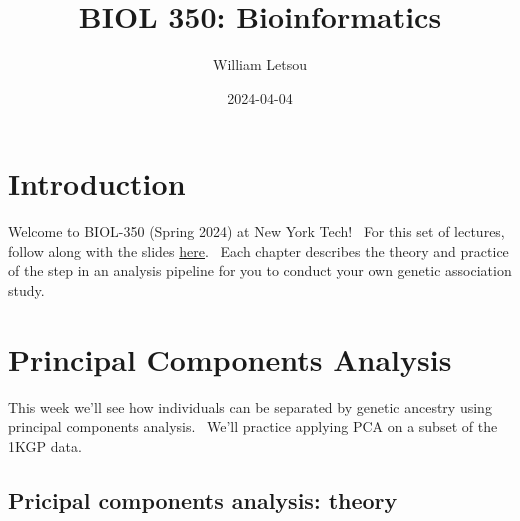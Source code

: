 \documentclass[
]{book}
\title{BIOL 350: Bioinformatics}
\author{William Letsou}
\date{2024-04-04}
\begin{document}
\maketitle

{
\setcounter{tocdepth}{1}
\tableofcontents
}
\hypertarget{intro}{%
\chapter{Introduction}\label{intro}}

Welcome to BIOL-350 (Spring 2024) at New York Tech!~ For this set of lectures, follow along with the slides \href{https://wletsou.github.io/BIOL-350/Biol\%20350\%20slides.pdf}{here}.~ Each chapter describes the theory and practice of the step in an analysis pipeline for you to conduct your own genetic association study.

\hypertarget{principal-components-analysis}{%
\chapter{Principal Components Analysis}\label{principal-components-analysis}}

This week we'll see how individuals can be separated by genetic ancestry using principal components analysis.~ We'll practice applying PCA on a subset of the 1KGP data.

\hypertarget{pricipal-components-analysis-theory}{%
\section{Pricipal components analysis: theory}\label{pricipal-components-analysis-theory}}
\end{document}
